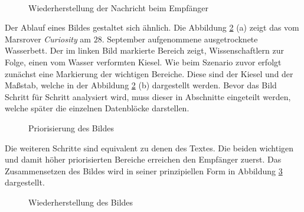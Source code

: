 \begin{figure}[H]
	\centering
	\hfill
	\\
	\label{fig:chatguiexample}
	\caption{Wiederherstellung der Nachricht beim Empfänger}
\end{figure}

Der Ablauf eines Bildes gestaltet sich ähnlich. Die Abbildung
\ref{fig:marsWaterResidue} (a) zeigt das vom Marsrover \textit{Curiosity}
am $28.$ September aufgenommene ausgetrocknete Wasserbett.  Der im
linken Bild markierte Bereich zeigt, Wissenschaftlern zur Folge, einen vom Wasser
verformten Kiesel. Wie beim Szenario zuvor erfolgt zunächst eine Markierung der wichtigen
Bereiche. Diese sind der Kiesel und der Maßstab, welche in der
Abbildung \ref{fig:marsWaterResidue} (b) dargestellt werden. Bevor das Bild
Schritt für Schritt analysiert wird, muss dieser in Abschnitte eingeteilt
werden, welche später die einzelnen Datenblöcke darstellen.
 
\begin{figure}[H]
	\centering
	\hfill
	\hfill
	\label{fig:marsWaterResidue}
	\caption{Priorisierung des Bildes}
\end{figure}

Die weiteren Schritte sind equivalent zu denen des Textes. Die beiden wichtigen
und damit höher priorisierten Bereiche erreichen den Empfänger zuerst.
Das Zusammensetzen des Bildes wird in seiner prinzipiellen Form in
Abbildung \ref{fig:marsWaterResidueEmpfaenger} dargestellt.

\begin{figure}[H]
	\centering
	\hfill
	\hfill
	\label{fig:marsWaterResidueEmpfaenger}
	\caption{Wiederherstellung des Bildes}
\end{figure}
